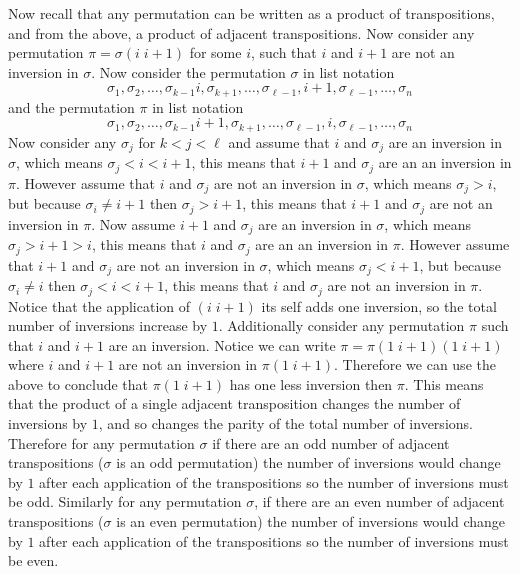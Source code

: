 \documentclass[12pt]{amsart}
\theoremstyle{definition}
\begin{document}
\begin{itemize}
Now recall that any permutation can be written as a product of transpositions, and from the above, a product of adjacent transpositions. Now consider any permutation $\pi=\sigma(i\;i+1)$ for some $i$, such that $i$ and $i+1$ are not an inversion in $\sigma$. Now consider the permutation $\sigma$ in list notation $$\sigma_1,\sigma_2,\dots,\sigma_{k-1}i,\sigma_{k+1},\dots,\sigma_{\ell-1},i+1,\sigma_{\ell-1},\dots,\sigma_n$$ and the permutation $\pi$ in list notation
$$\sigma_1,\sigma_2,\dots,\sigma_{k-1}i+1,\sigma_{k+1},\dots,\sigma_{\ell-1},i,\sigma_{\ell-1},\dots,\sigma_n$$
Now consider any $\sigma_j$ for $k<j<\ell$ and assume that $i$ and $\sigma_j$ are an inversion in $\sigma$, which means $\sigma_j<i<i+1$, this means that $i+1$ and $\sigma_j$ are an an inversion in $\pi$. However assume that $i$ and $\sigma_j$ are not an inversion in $\sigma$, which means $\sigma_j>i$, but because $\sigma_i\neq i+1$ then $\sigma_j>i+1$, this means that $i+1$ and $\sigma_j$ are not an inversion in $\pi$.
Now assume $i+1$ and $\sigma_j$ are an inversion in $\sigma$, which means $\sigma_j>i+1>i$, this means that $i$ and $\sigma_j$ are an an inversion in $\pi$. However assume that $i+1$ and $\sigma_j$ are not an inversion in $\sigma$, which means $\sigma_j<i+1$, but because $\sigma_i\neq i$ then $\sigma_j<i<i+1$, this means that $i$ and $\sigma_j$ are not an inversion in $\pi$. Notice that the application of $(i\;i+1)$ its self adds one inversion, so the total number of inversions increase by $1$. Additionally consider any permutation $\pi$ such that $i$ and $i+1$ are an inversion. Notice we can write $\pi=\pi(1\;i+1)(1\;i+1)$ where $i$ and $i+1$ are not an inversion in $\pi(1\;i+1)$. Therefore we can use the above to conclude that $\pi(1\;i+1)$ has one less inversion then $\pi$. This means that the product of a single adjacent transposition changes the number of inversions by $1$, and so changes the parity of the total number of inversions. Therefore for any permutation $\sigma$ if there are an odd number of adjacent transpositions ($\sigma$ is an odd permutation) the number of inversions would change by $1$ after each application of the transpositions so the number of inversions must be odd. Similarly for any permutation $\sigma$, if there are an even number of adjacent transpositions ($\sigma$ is an even permutation) the number of inversions would change by $1$ after each application of the transpositions so the number of inversions must be even. \\



\end{itemize}
\end{document}

